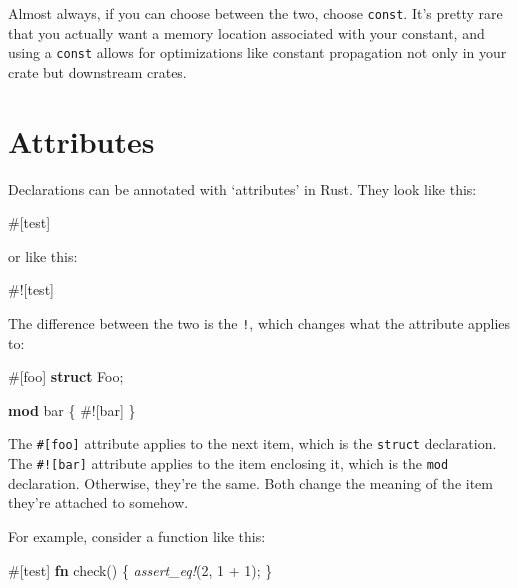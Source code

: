 \documentclass[a4paper,]{book}
\renewcommand*{\hypertarget}[3][\ar]{%
  \def\ar{#2}%
  \label{#1}%
  #3}
\newenvironment{Shaded}{\begin{snugshade}}{\end{snugshade}}
\newcommand{\KeywordTok}[1]{\textcolor[rgb]{0.13,0.29,0.53}{\textbf{{#1}}}}
\newcommand{\DecValTok}[1]{\textcolor[rgb]{0.00,0.00,0.81}{{#1}}}
\newcommand{\PreprocessorTok}[1]{\textcolor[rgb]{0.56,0.35,0.01}{\textit{{#1}}}}
\newcommand{\AttributeTok}[1]{\textcolor[rgb]{0.77,0.63,0.00}{{#1}}}
\newcommand{\NormalTok}[1]{{#1}}
\begin{document}
Almost always, if you can choose between the two, choose \texttt{const}.
It's pretty rare that you actually want a memory location associated
with your constant, and using a \texttt{const} allows for optimizations
like constant propagation not only in your crate but downstream crates.

\hypertarget{sec--attributes}{\section{Attributes}\label{sec--attributes}}

Declarations can be annotated with `attributes' in Rust. They look like
this:

\begin{Shaded}
\begin{Highlighting}[]
\AttributeTok{#[}\NormalTok{test}\AttributeTok{]}
\end{Highlighting}
\end{Shaded}

or like this:

\begin{Shaded}
\begin{Highlighting}[]
\AttributeTok{#![}\NormalTok{test}\AttributeTok{]}
\end{Highlighting}
\end{Shaded}

The difference between the two is the \texttt{!}, which changes what the
attribute applies to:

\begin{Shaded}
\begin{Highlighting}[]
\AttributeTok{#[}\NormalTok{foo}\AttributeTok{]}
\KeywordTok{struct} \NormalTok{Foo;}

\KeywordTok{mod} \NormalTok{bar \{}
    \AttributeTok{#![}\NormalTok{bar}\AttributeTok{]}
\NormalTok{\}}
\end{Highlighting}
\end{Shaded}

The \texttt{\#{[}foo{]}} attribute applies to the next item, which is
the \texttt{struct} declaration. The \texttt{\#!{[}bar{]}} attribute
applies to the item enclosing it, which is the \texttt{mod} declaration.
Otherwise, they're the same. Both change the meaning of the item they're
attached to somehow.

For example, consider a function like this:

\begin{Shaded}
\begin{Highlighting}[]
\AttributeTok{#[}\NormalTok{test}\AttributeTok{]}
\KeywordTok{fn} \NormalTok{check() \{}
    \PreprocessorTok{assert_eq!}\NormalTok{(}\DecValTok{2}\NormalTok{, }\DecValTok{1} \NormalTok{+ }\DecValTok{1}\NormalTok{);}
\NormalTok{\}}
\end{Highlighting}
\end{Shaded}
\end{document}
